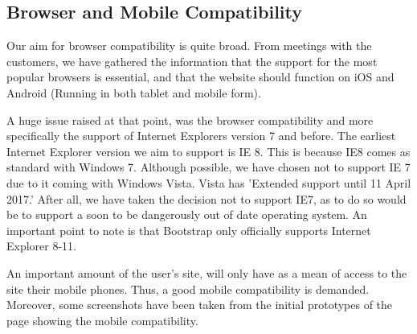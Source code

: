 \documentclass{l3proj}
\begin{document}
\subsection{Browser and Mobile Compatibility}
\label{sec:compatibility} 

Our aim for browser compatibility is quite broad. From meetings with the customers, we have gathered the information that the support for the most popular browsers is essential, and that the website should function on iOS and Android (Running in both tablet and mobile form).

 A huge issue raised at that point, was the browser compatibility and more specifically the support of Internet Explorers version 7 and before. The earliest Internet Explorer version we aim to support is IE 8. This is because IE8 comes as standard with Windows 7. Although possible, we have chosen not to support IE 7 due to it coming with Windows Vista. Vista has 'Extended support until 11 April 2017.' After all, we have taken the decision not to support IE7, as to do so would be to support a soon to be dangerously out of date operating system. An important point to note is that Bootstrap only officially supports Internet Explorer 8-11.
 
 An important amount of the user's site, will only have as a mean of access to the site their mobile phones. Thus, a good mobile compatibility is demanded. Moreover, some screenshots have been taken from the initial prototypes of the page showing the mobile compatibility.
\end{document}
